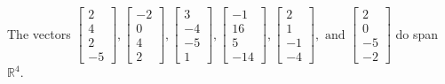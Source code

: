 \begin{exercise}
\begin{exerciseStatement}
  \end{exerciseStatement}
  \begin{exerciseAnswer}
   The vectors \(\left[\begin{array}{r}
2 \\
4 \\
2 \\
-5
\end{array}\right] , \left[\begin{array}{r}
-2 \\
0 \\
4 \\
2
\end{array}\right] , \left[\begin{array}{r}
3 \\
-4 \\
-5 \\
1
\end{array}\right] , \left[\begin{array}{r}
-1 \\
16 \\
5 \\
-14
\end{array}\right] , \left[\begin{array}{r}
2 \\
1 \\
-1 \\
-4
\end{array}\right] , \text{ and } \left[\begin{array}{r}
2 \\
0 \\
-5 \\
-2
\end{array}\right]\) 
  	 do  
	span \(\mathbb{R}^4\).
  


  \end{exerciseAnswer}
\end{exercise}